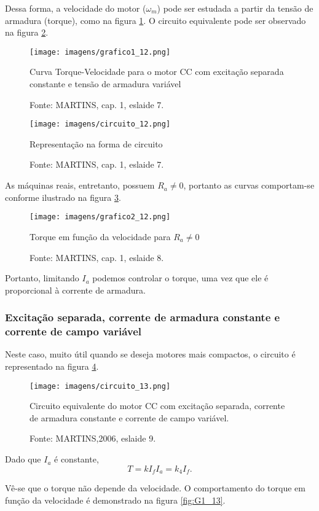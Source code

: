 Dessa forma, a velocidade do motor ($\omega_m$) pode ser estudada a partir da tensão de armadura (torque), como na figura \ref{fig:G1_12}. O circuito equivalente pode ser observado na figura \ref{fig:C12}.

\begin{figure}[ht!]
\center
\texttt{[image: imagens/grafico1\_12.png]}
\caption{\label{fig:G1_12}Curva Torque-Velocidade para o motor CC com excitação separada constante e tensão de armadura variável}
\caption*{Fonte: MARTINS, cap. 1, eslaide 7.}
\end{figure}


\begin{figure}[ht!]
\center
\texttt{[image: imagens/circuito\_12.png]}
\caption{\label{fig:C12}Representação na forma de circuito}
\caption*{Fonte: MARTINS, cap. 1, eslaide 7.}
\end{figure}

As máquinas reais, entretanto, possuem $R_{a} \neq 0$, portanto as curvas comportam-se conforme ilustrado na figura \ref{fig:G2_12}.

\begin{figure}[ht!]
\center
\texttt{[image: imagens/grafico2\_12.png]}
\caption{\label{fig:G2_12}Torque em função da velocidade para $R_a \neq 0$}
\caption*{Fonte: MARTINS, cap. 1, eslaide 8.}
\end{figure}

Portanto, limitando $I_{a}$ podemos controlar o torque, uma vez que ele é proporcional à corrente de armadura.

\subsubsection{Excitação separada, corrente de armadura constante e corrente de campo variável}

Neste caso, muito útil quando se deseja motores mais compactos, o circuito é representado na figura \ref{fig:C13}.

\begin{figure}[ht!]
\center
\texttt{[image: imagens/circuito\_13.png]}
\caption{\label{fig:C13} Circuito equivalente do motor CC com excitação separada, corrente de armadura constante e corrente de campo variável.}
\caption*{Fonte: MARTINS,2006, eslaide 9.}
\end{figure}

Dado que $I_{a}$ é constante,
\[T = kI_{f}I_{a} = k_{4}I_{f}.\]

Vê-se que o torque não depende da velocidade. O comportamento do torque em função da velocidade é demonstrado na figura \ref{fig:G1_13}.

